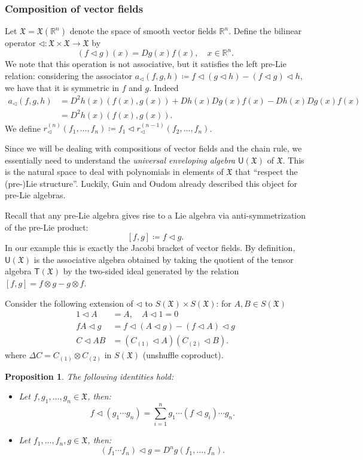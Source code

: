\documentclass[10pt, reqno]{article}
\theoremstyle{definition}
\theoremstyle{plain}
\newtheorem{proposition}{Proposition}
\newcommand{\R}{\mathbb{R}}
\newcommand{\fX}{\mathfrak{X}}
\begin{document}
\subsubsection{Composition of vector fields}
Let \(\fX=\fX(\R^n)\) denote the space of smooth vector fields \(\R^n\).
Define the bilinear operator \(\triangleleft\colon\fX\times\fX\to\fX\)
by
\[
	(f\triangleleft g)(x)=Dg(x)f(x),\quad x\in\R^n.
\]
We note that this operation is not associative, but it satisfies the left pre-Lie relation:
considering the associator
\(a_\triangleleft(f,g,h)\coloneqq f\triangleleft(g\triangleleft h)-(f\triangleleft g)\triangleleft h\),
we have that it is symmetric in \(f\) and \(g\).
Indeed
\begin{align*}
	a_\triangleleft(f,g,h)&= D^2h(x)(f(x),g(x)) + Dh(x)Dg(x)f(x) - Dh(x)Dg(x)f(x)\\
	&= D^2h(x)(f(x),g(x)).
\end{align*}
We define \(r^{(n)}_\triangleleft(f_1,\dotsc,f_n)\coloneqq f_1\triangleleft r^{(n-1)}_\triangleleft(f_2,\dotsc,f_n)\).

Since we will be dealing with compositions of vector fields and the chain rule, we essentially need to understand the
\emph{universal enveloping algebra} \(\mathsf{U}(\fX)\) of \(\fX\). This is the natural space to deal with polynomials in elements of
\(\fX\) that ``respect the (pre-)Lie structure''.
Luckily, Guin and Oudom already described this object for pre-Lie algebras.

Recall that any pre-Lie algebra gives rise to a Lie algebra via anti-symmetrization of the pre-Lie product:
\[
	[f,g]\coloneqq f\triangleleft g.
\]
In our example this is exactly the Jacobi bracket of vector fields.
By definition, \(\mathsf{U}(\fX)\) is the associative algebra obtained by taking the quotient of the
tensor algebra \(\mathsf{T}(\fX)\) by the two-sided ideal generated by the relation \([f,g]=f\otimes g-g\otimes f\).

Consider the following extension of \(\triangleleft\) to \(S(\fX)\times S(\fX)\): for \(A,B\in S(\fX)\)
\begin{align*}
	1\triangleleft A&= A,\quad A\triangleleft 1=0\\
	fA\triangleleft g&= f\triangleleft (A\triangleleft g)-(f\triangleleft A)\triangleleft g\\
	C\triangleleft AB&= (C_{(1)}\triangleleft A)(C_{(2)}\triangleleft B).
\end{align*}
where \(\Delta C=C_{(1)}\otimes C_{(2)}\) in \(S(\fX)\) (unshuffle coproduct).
\begin{proposition}
	The following identities hold:
	\begin{itemize}
		\item Let \(f,g_1,\dotsc,g_n\in\fX\), then:
			\[
				f\triangleleft(g_1\dotsm g_n)=\sum_{i=1}^ng_1\dotsm(f\triangleleft g_i)\dotsm g_n.
			\]
		\item Let \(f_1,\dotsc,f_n,g\in\fX\), then:
			\[
				(f_1\dotsm f_n)\triangleleft g=D^ng(f_1,\dotsc,f_n).
			\]
	\end{itemize}
\end{proposition}
\end{document}
